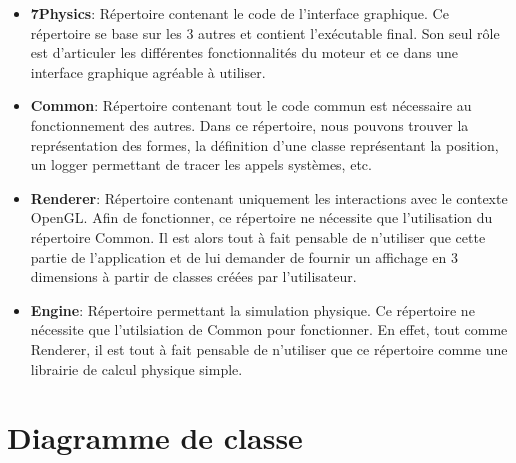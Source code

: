\documentclass[11pt]{report}
\begin{document}
\begin{itemize}
  \item \textbf{7Physics}: Répertoire contenant le code de l'interface graphique. Ce répertoire se base sur les 3 autres
        et contient l'exécutable final. Son seul rôle est d'articuler les différentes fonctionnalités du moteur et ce
        dans une interface graphique agréable à utiliser.\newline
  \item\textbf{Common}: Répertoire contenant tout le code commun est nécessaire au fonctionnement des autres. Dans ce
        répertoire, nous pouvons trouver la représentation des formes, la définition d'une classe représentant la position,
        un logger permettant de tracer les appels systèmes, etc.\newline
  \item \textbf{Renderer}: Répertoire contenant uniquement les interactions avec le contexte OpenGL. Afin de fonctionner,
        ce répertoire ne nécessite que l'utilisation du répertoire Common. Il est alors tout à fait pensable de n'utiliser
        que cette partie de l'application et de lui demander de fournir un affichage en 3 dimensions à partir de classes
        créées par l'utilisateur.\newline
  \item \textbf{Engine}: Répertoire permettant la simulation physique. Ce répertoire ne nécessite que l'utilsiation
        de Common pour fonctionner. En effet, tout comme Renderer, il est tout à fait pensable de n'utiliser que ce répertoire
        comme une librairie de calcul physique simple.\newline
\end{itemize}

\chapter{Diagramme de classe}
\end{document}
